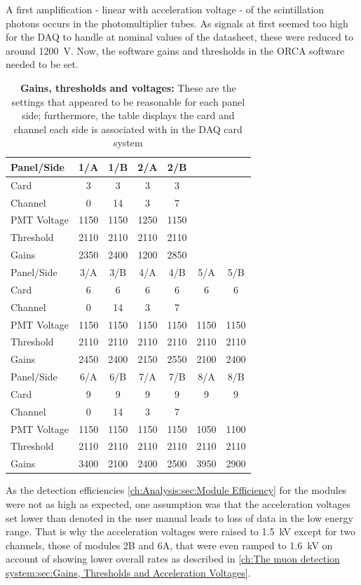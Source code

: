   A first amplification - linear with acceleration voltage - of the scintillation photons occurs in the photomultiplier tubes. As signals at first seemed too high for the DAQ to handle at nominal values of the datasheet, these were reduced to around \SI{1200}{\volt}. Now, the software gains and thresholds in the ORCA software needed to be set. 
    \begin{table}
    
    \centering
    \begin{tabular}{|l|cccccc|}
      \hline
      Panel/Side 	&1/A 	&1/B	&2/A	&2/B	&	&	\\
      \hline
      Card 	&3	&3	&3	&3	&	&	\\
      Channel	&0	&14	&3	&7	&	&	\\
      PMT Voltage	&1150	&1150	&1250	&1150	&	&	\\
      Threshold	&2110	&2110	&2110	&2110	&	&	\\
      Gains	&2350	&2400	&1200	&2850	&	&	\\
      \hline
      Panel/Side 	&3/A 	&3/B	&4/A	&4/B	&5/A	&5/B	\\
      \hline
      Card 	&6	&6	&6	&6	&6	&6	\\
      Channel	&0	&14	&3	&7	&	&	\\
      PMT Voltage	&1150	&1150	&1150	&1150	&1150	&1150   \\
      Threshold	&2110	&2110	&2110	&2110	&2110	&2110   \\
      Gains	&2450	&2400	&2150	&2550	&2100	&2400   \\
      \hline
      Panel/Side 	&6/A 	&6/B	&7/A	&7/B	&8/A	&8/B	\\
      \hline
      Card 	&9	&9	&9	&9	&9	&9	\\
      Channel	&0	&14	&3	&7	&	&	\\
      PMT Voltage	&1150	&1150	&1150	&1150	&1050	&1100	\\
      Threshold	&2110	&2110	&2110	&2110	&2110	&2110   \\
      Gains	&3400	&2100	&2400	&2500	&3950	&2900   \\
      \hline
    

   \end{tabular}
  \caption[Gains - thresholds - acceleration voltages]{{\bf Gains, thresholds and voltages:} These are the settings that appeared to be reasonable for each panel side; furthermore, the table displays the card and channel each side is associated with in the DAQ card system}
  \end{table}
  As the detection efficiencies \ref{ch:Analysis:sec:Module Efficiency} for the modules were not as high as expected, one assumption was that the acceleration voltages set lower than denoted in the user manual leads to loss of data in the low energy range. That is why the acceleration voltages were raised to \SI{1.5}{\kilo\volt} except for two channels, those of modules 2B and 6A, that were even ramped to \SI{1.6}{\kilo\volt} on account of showing lower overall rates as described in \ref{ch:The muon detection system:sec:Gains, Thresholds and Acceleration Voltages}. 
  
